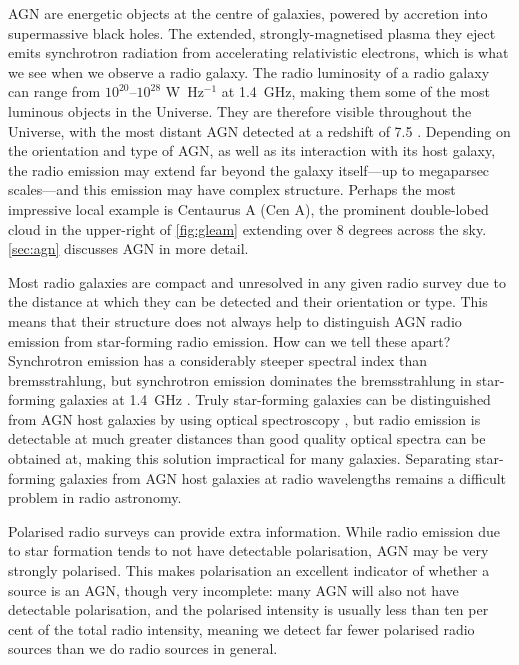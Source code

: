     AGN are energetic objects at the centre of galaxies, powered by accretion into supermassive black holes. The extended, strongly-magnetised plasma they eject emits synchrotron radiation from accelerating relativistic electrons, which is what we see when we observe a radio galaxy. The radio luminosity of a radio galaxy can range from $10^{20}$--$10^{28}$ W~Hz$^{-1}$ \citep{pracy16rlf} at 1.4~GHz, making them some of the most luminous objects in the Universe. They are therefore visible throughout the Universe, with the most distant AGN detected at a redshift of 7.5 \citep{banados_800-million-solar-mass_2018}. Depending on the orientation and type of AGN, as well as its interaction with its host galaxy, the radio emission may extend far beyond the galaxy itself---up to megaparsec scales---and this emission may have complex structure. Perhaps the most impressive local example is Centaurus A (Cen A), the prominent double-lobed cloud in the upper-right of \autoref{fig:gleam} extending over 8 degrees across the sky. \autoref{sec:agn} discusses AGN in more detail.

    Most radio galaxies are compact and unresolved in any given radio survey due to the distance at which they can be detected and their orientation or type. This means that their structure does not always help to distinguish AGN radio emission from star-forming radio emission. How can we tell these apart? Synchrotron emission has a considerably steeper spectral index than bremsstrahlung, but synchrotron emission dominates the bremsstrahlung in star-forming galaxies at 1.4~GHz \citep{condon92radio}. Truly star-forming galaxies can be distinguished from AGN host galaxies by using optical spectroscopy \citep[e.g.][]{mauch_radio_2007, groves_distinguishing_2007}, but radio emission is detectable at much greater distances than good quality optical spectra can be obtained at, making this solution impractical for many galaxies. Separating star-forming galaxies from AGN host galaxies at radio wavelengths remains a difficult problem in radio astronomy.

    Polarised radio surveys can provide extra information. While radio emission due to star formation tends to not have detectable polarisation, AGN may be very strongly polarised. This makes polarisation an excellent indicator of whether a source is an AGN, though very incomplete: many AGN will also not have detectable polarisation, and the polarised intensity is usually less than ten per cent of the total radio intensity, meaning we detect far fewer polarised radio sources than we do radio sources in general.

